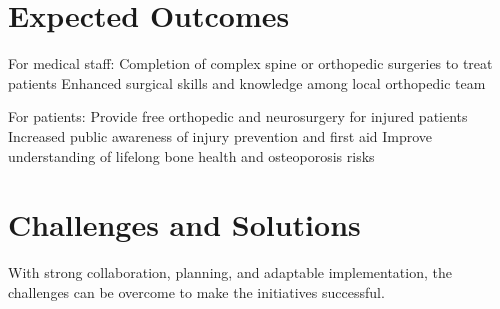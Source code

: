 \documentclass{article}
\begin{document}







%



\section{Expected Outcomes}

\begin{outline}
\1 For medical staff:
\2 Completion of complex spine or orthopedic surgeries to treat patients
\2 Enhanced surgical skills and knowledge among local orthopedic team

\1 For patients:
\2 Provide free orthopedic and neurosurgery for injured patients
\2 Increased public awareness of injury prevention and first aid
\2 Improve understanding of lifelong bone health and osteoporosis risks
\end{outline}


\section{Challenges and Solutions}
With strong collaboration, planning, and adaptable implementation, the challenges can be overcome to make the initiatives successful.
\end{document}
